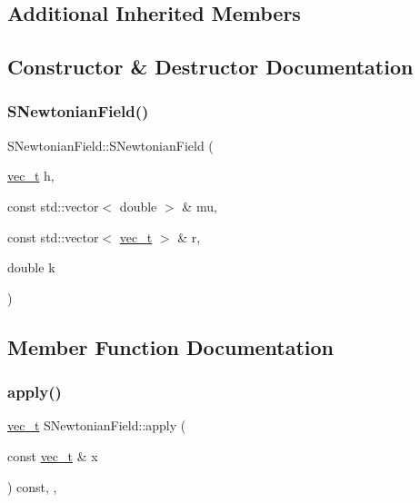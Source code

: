 \subsection*{Additional Inherited Members}


\subsection{Constructor \& Destructor Documentation}
\mbox{\label{class_s_newtonian_field_a3e0816f9bbfd74f70b881562a0d590b5}} 
\subsubsection{\texorpdfstring{SNewtonianField()}{SNewtonianField()}}
{\footnotesize\ttfamily S\+Newtonian\+Field\+::\+S\+Newtonian\+Field (\begin{DoxyParamCaption}\item[{\mbox{\hyperlink{_n_vector_8h_a0a2cfc67e738a3d73e4f12098c4c07f6}{vec\+\_\+t}}}]{h,  }\item[{const std\+::vector$<$ double $>$ \&}]{mu,  }\item[{const std\+::vector$<$ \mbox{\hyperlink{_n_vector_8h_a0a2cfc67e738a3d73e4f12098c4c07f6}{vec\+\_\+t}} $>$ \&}]{r,  }\item[{double}]{k }\end{DoxyParamCaption})}



\subsection{Member Function Documentation}
\mbox{\label{class_s_newtonian_field_a1f42f77de6b77085a6a5f018fe44d41e}} 
\subsubsection{\texorpdfstring{apply()}{apply()}}
{\footnotesize\ttfamily \mbox{\hyperlink{_n_vector_8h_a0a2cfc67e738a3d73e4f12098c4c07f6}{vec\+\_\+t}} S\+Newtonian\+Field\+::apply (\begin{DoxyParamCaption}\item[{const \mbox{\hyperlink{_n_vector_8h_a0a2cfc67e738a3d73e4f12098c4c07f6}{vec\+\_\+t}} \&}]{x }\end{DoxyParamCaption}) const\hspace{0.3cm}{\ttfamily [override]}, {\ttfamily [protected]}, {\ttfamily [virtual]}}



